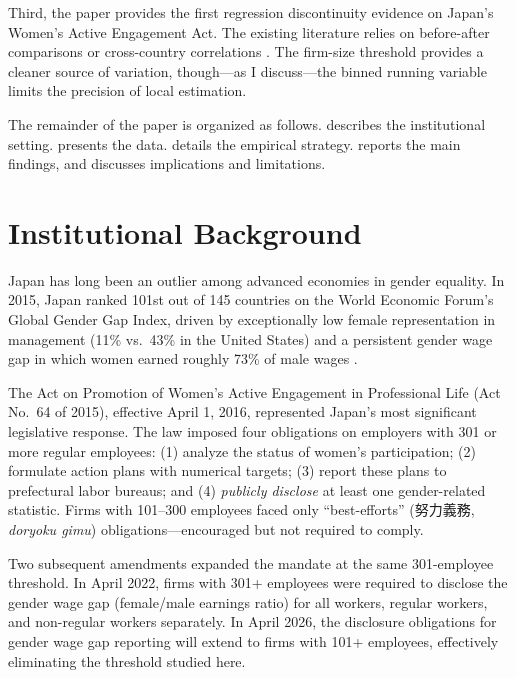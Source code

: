 \documentclass[12pt]{article}
\begin{document}
Third, the paper provides the first regression discontinuity evidence on Japan's Women's Active Engagement Act. The existing literature relies on before-after comparisons \citep{yamaguchi2019,asai2021,kawaguchi2023} or cross-country correlations \citep{oecd2020}. The firm-size threshold provides a cleaner source of variation, though---as I discuss---the binned running variable limits the precision of local estimation.

The remainder of the paper is organized as follows.  describes the institutional setting.  presents the data.  details the empirical strategy.  reports the main findings, and  discusses implications and limitations.


\section{Institutional Background}
\label{sec:background}

Japan has long been an outlier among advanced economies in gender equality. In 2015, Japan ranked 101st out of 145 countries on the World Economic Forum's Global Gender Gap Index, driven by exceptionally low female representation in management (11\% vs.\ 43\% in the United States) and a persistent gender wage gap in which women earned roughly 73\% of male wages \citep{wef2015}.

The Act on Promotion of Women's Active Engagement in Professional Life (Act No.\ 64 of 2015), effective April 1, 2016, represented Japan's most significant legislative response. The law imposed four obligations on employers with 301 or more regular employees: (1) analyze the status of women's participation; (2) formulate action plans with numerical targets; (3) report these plans to prefectural labor bureaus; and (4) \textit{publicly disclose} at least one gender-related statistic. Firms with 101--300 employees faced only ``best-efforts'' (努力義務, \textit{doryoku gimu}) obligations---encouraged but not required to comply.

Two subsequent amendments expanded the mandate at the same 301-employee threshold. In April 2022, firms with 301+ employees were required to disclose the gender wage gap (female/male earnings ratio) for all workers, regular workers, and non-regular workers separately. In April 2026, the disclosure obligations for gender wage gap reporting will extend to firms with 101+ employees, effectively eliminating the threshold studied here.
\end{document}
